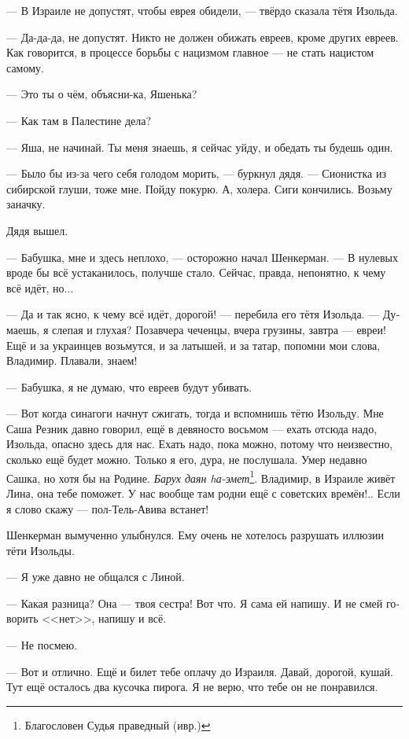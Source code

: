 \documentclass[a5paper,12pt,fleqn]{extbook}\usepackage{cooltooltips}\usepackage{polyglossia}\setdefaultlanguage[babelshorthands=true]{russian}\setotherlanguage{english}\defaultfontfeatures{Ligatures=TeX,Mapping=tex-text} \usepackage{xcolor}\definecolor{lightgray}{HTML}{bbbbbb}\color{lightgray}\newcommand{\ml}[3]{\textenglish{\textcolor{black}{#3}}}
\begin{document}
--- В Израиле не допустят, чтобы еврея обидели, --- твёрдо сказала тётя Изольда.

--- Да-да-да, не допустят.
Никто не должен обижать евреев, кроме других евреев.
Как говорится, в процессе борьбы с нацизмом главное --- не стать нацистом самому.

--- Это ты о чём, объясни-ка, Яшенька?

--- Как там в Палестине дела?

--- Яша, не начинай.
Ты меня знаешь, я сейчас уйду, и обедать ты будешь один.

--- Было бы из-за чего себя голодом морить, --- буркнул дядя.
--- Сионистка из сибирской глуши, тоже мне.
Пойду покурю.
А, холера.
Сиги кончились.
Возьму заначку.

Дядя вышел.

--- Бабушка, мне и здесь неплохо, --- осторожно начал Шенкерман.
--- В нулевых вроде бы всё устаканилось, получше стало.
Сейчас, правда, непонятно, к чему всё идёт, но...

--- Да и так ясно, к чему всё идёт, дорогой! --- перебила его тётя Изольда.
--- Думаешь, я слепая и глухая?
Позавчера чеченцы, вчера грузины, завтра --- евреи!
Ещё и за украинцев возьмутся, и за латышей, и за татар, попомни мои слова, Владимир.
Плавали, знаем!

--- Бабушка, я не думаю, что евреев будут убивать.

--- Вот когда синагоги начнут сжигать, тогда и вспомнишь тётю Изольду.
Мне Саша Резник давно говорил, ещё в девяносто восьмом --- ехать отсюда надо, Изольда, опасно здесь для нас.
Ехать надо, пока можно, потому что неизвестно, сколько ещё будет можно.
Только я его, дура, не послушала.
Умер недавно Сашка, но хотя бы на Родине.
\textit{Барух даян hа-эмет}\footnote{Благословен Судья праведный (ивр.)}.
Владимир, в Израиле живёт Лина, она тебе поможет.
У нас вообще там родни ещё с советских времён!..
Если я слово скажу --- пол-Тель-Авива встанет!

Шенкерман вымученно улыбнулся.
Ему очень не хотелось разрушать иллюзии тёти Изольды.

--- Я уже давно не общался с Линой.

--- Какая разница?
Она --- твоя сестра!
Вот что.
Я сама ей напишу.
И не смей говорить <<нет>>, напишу и всё.

--- Не посмею.

--- Вот и отлично.
Ещё и билет тебе оплачу до Израиля.
Давай, дорогой, кушай.
Тут ещё осталось два кусочка пирога.
Я не верю, что тебе он не понравился.
\end{document}
